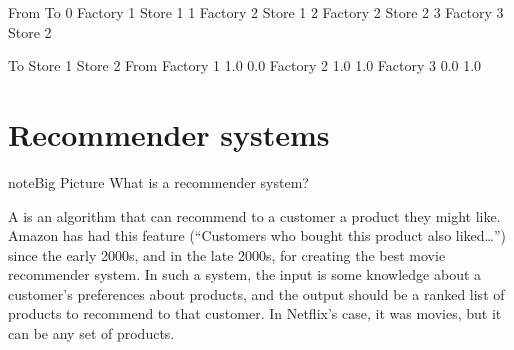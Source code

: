 \documentclass[letterpaper,10pt,english]{jupyterBook}
\begin{document}
\begin{sphinxVerbatim}[commandchars=\\\{\}]
        From       To
0  Factory 1  Store 1
1  Factory 2  Store 1
2  Factory 2  Store 2
3  Factory 3  Store 2
\end{sphinxVerbatim}

\begin{sphinxVerbatim}[commandchars=\\\{\}]
\PYG{p}{[}\PYG{p}{]}  
      
  
\end{sphinxVerbatim}

\begin{sphinxVerbatim}[commandchars=\\\{\}]
To         Store 1  Store 2
From                       
Factory 1      1.0      0.0
Factory 2      1.0      1.0
Factory 3      0.0      1.0
\end{sphinxVerbatim}


\section{Recommender systems}
\label{\detokenize{chapter-16-matrices:recommender-systems}}
\begin{sphinxadmonition}{note}{Big Picture \sphinxhyphen{} What is a recommender system?}

\sphinxAtStartPar
A  is an algorithm that can recommend to a customer a product they might like.  Amazon has had this feature (“Customers who bought this product also liked…”) since the early 2000s, and in the late 2000s,  for creating the best movie recommender system.  In such a system, the input is some knowledge about a customer’s preferences about products, and the output should be a ranked list of products to recommend to that customer.  In Netflix’s case, it was movies, but it can be any set of products.
\end{sphinxadmonition}
\end{document}
